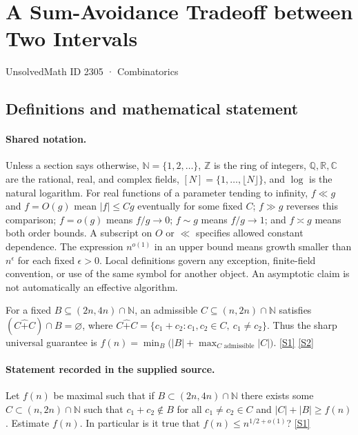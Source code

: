 \documentclass[11pt,a4paper]{article}
\newcommand{\N}{\mathbb{N}}
\newcommand{\Z}{\mathbb{Z}}
\newcommand{\Q}{\mathbb{Q}}
\newcommand{\R}{\mathbb{R}}
\newcommand{\C}{\mathbb{C}}
\newcommand{\sref}[2]{\hyperlink{source:#1:#2}{[S#2]}}
\begin{document}

\setcounter{section}{2304}

\section{A Sum-Avoidance Tradeoff between Two Intervals}\label{2305}

{\small\sffamily UnsolvedMath ID 2305 · Combinatorics}

\subsection{Definitions and mathematical statement}

\paragraph{Shared notation.}Unless a section says otherwise, $\N=\{1,2,\ldots\}$,
$\Z$ is the ring of integers, $\Q,\R,\C$ are the rational, real, and complex
fields, $[N]=\{1,\ldots,\lfloor N\rfloor\}$, and $\log$ is the natural
logarithm. For real functions of a parameter tending to infinity,
$f\ll g$ and $f=O(g)$ mean $|f|\leq Cg$ eventually for some fixed $C$;
$f\gg g$ reverses this comparison; $f=o(g)$ means $f/g\to0$;
$f\sim g$ means $f/g\to1$; and $f\asymp g$ means both order bounds.
A subscript on $O$ or $\ll$ specifies allowed constant dependence.
The expression $n^{o(1)}$ in an upper bound means growth smaller than
$n^\epsilon$ for each fixed $\epsilon>0$. Local definitions govern any
exception, finite-field convention, or use of the same symbol for another
object. An asymptotic claim is not automatically an effective algorithm.



For a fixed $B\subseteq(2n,4n)\cap\N$, an admissible $C\subseteq(n,2n)\cap\N$ satisfies $(C\mathbin{\hat+}C)\cap B=\varnothing$, where $C\mathbin{\hat+}C=\{c_1+c_2:c_1,c_2\in C,\ c_1\ne c_2\}$. Thus the sharp universal guarantee is $f(n)=\min_B\bigl(|B|+\max_{C\text{ admissible}}|C|\bigr)$. \sref{2305}{1} \sref{2305}{2}

\paragraph{Statement recorded in the supplied source.}
Let $f(n)$ be maximal such that if $B\subset (2n,4n)\cap \mathbb{N}$ there exists some $C\subset (n,2n)\cap \mathbb{N}$ such that $c_1+c_2\not\in B$ for all $c_1\neq c_2\in C$ and $\lvert C\rvert+\lvert B\rvert \geq f(n)$.
Estimate $f(n)$. In particular is it true that $f(n)\leq n^{1/2+o(1)}$? \sref{2305}{1}
\end{document}
